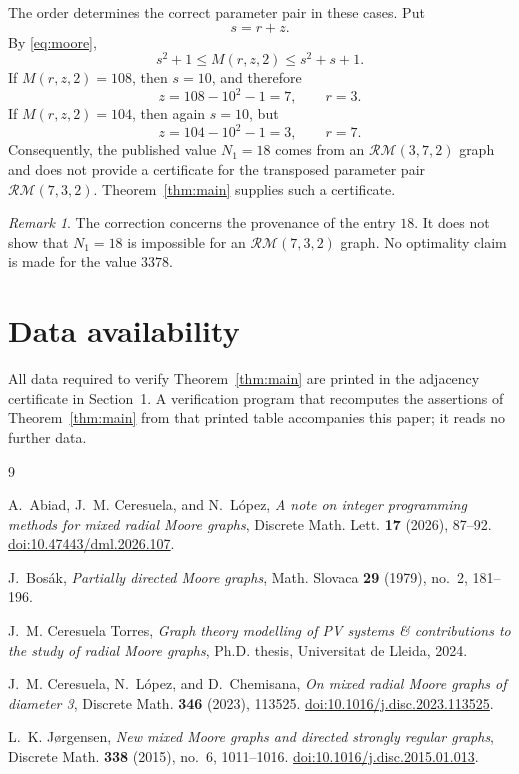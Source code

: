 \documentclass[11pt]{amsart}
\theoremstyle{remark}
\newtheorem{remark}[theorem]{Remark}
\newcommand{\RM}{\mathcal{RM}}
\begin{document}
The order determines the correct parameter pair in these cases. Put
\[
s=r+z.
\]
By \eqref{eq:moore},
\[
s^2+1\le M(r,z,2)\le s^2+s+1.
\]
If $M(r,z,2)=108$, then $s=10$, and therefore
\[
z=108-10^2-1=7,
\qquad
r=3.
\]
If $M(r,z,2)=104$, then again $s=10$, but
\[
z=104-10^2-1=3,
\qquad
r=7.
\]
Consequently, the published value $N_1=18$ comes from an
$\RM(3,7,2)$ graph and does not provide a certificate for the
transposed parameter pair $\RM(7,3,2)$. Theorem~\ref{thm:main}
supplies such a certificate.

\begin{remark}
The correction concerns the provenance of the entry $18$. It does not
show that $N_1=18$ is impossible for an $\RM(7,3,2)$ graph. No
optimality claim is made for the value $3378$.
\end{remark}

\section*{Data availability}

All data required to verify Theorem~\ref{thm:main} are printed in the
adjacency certificate in Section~1. A verification program that
recomputes the assertions of Theorem~\ref{thm:main} from that printed
table accompanies this paper; it reads no further data.

\begin{thebibliography}{9}

A.~Abiad, J.~M. Ceresuela, and N.~L\'opez,
\emph{A note on integer programming methods for mixed radial Moore
graphs},
Discrete Math. Lett. \textbf{17} (2026), 87--92.
\href{https://doi.org/10.47443/dml.2026.107}
{doi:10.47443/dml.2026.107}.

J.~Bos\'ak,
\emph{Partially directed Moore graphs},
Math. Slovaca \textbf{29} (1979), no.~2, 181--196.

J.~M. Ceresuela Torres,
\emph{Graph theory modelling of PV systems \& contributions to the
study of radial Moore graphs},
Ph.D. thesis, Universitat de Lleida, 2024.

J.~M. Ceresuela, N.~L\'opez, and D.~Chemisana,
\emph{On mixed radial Moore graphs of diameter 3},
Discrete Math. \textbf{346} (2023), 113525.
\href{https://doi.org/10.1016/j.disc.2023.113525}
{doi:10.1016/j.disc.2023.113525}.

L.~K. J{\o}rgensen,
\emph{New mixed Moore graphs and directed strongly regular graphs},
Discrete Math. \textbf{338} (2015), no.~6, 1011--1016.
\href{https://doi.org/10.1016/j.disc.2015.01.013}
{doi:10.1016/j.disc.2015.01.013}.

\end{thebibliography}
\end{document}
